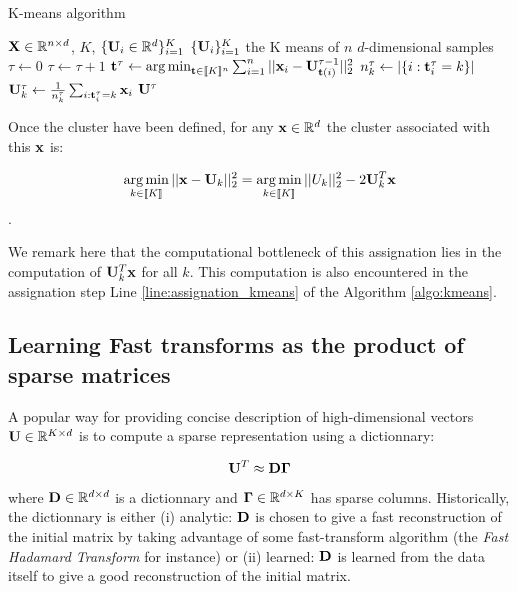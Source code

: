 \documentclass{article}
\def\rmGamma{{\mathbf{\Gamma}}}
\begin{document}
\begin{algorithm}
\caption{K-means algorithm}
\label{algo:kmeans}
\begin{algorithmic}[1]


\REQUIRE ${\mathbf{X}} \in \mathbb{R}^{n \times d}$, $K$, $\{{\mathbf{U}}_i \in \mathbb{R}^d\}_{i=1}^{K}$
\ENSURE $\{{\mathbf{U}}_i\}_{i=1}^{K}$ the K means of $n$ $d$-dimensional samples
\STATE $\tau \leftarrow 0$
\REPEAT
\STATE $\tau \leftarrow \tau + 1$
\STATE ${\mathbf{t}}^\tau \leftarrow \operatorname*{arg\,min}_{{\mathbf{t}} \in [\![K]\!]^n} \sum_{i=1}^{n} {||{\mathbf{x}}_i - {\mathbf{U}}^{\tau-1}_{{\mathbf{t}}(i)}||_2^2}$
\label{line:assignation_kmeans}
\STATE $n_k^\tau \leftarrow |\{i: {\mathbf{t}}^\tau_i=k\}|$
\STATE ${\mathbf{U}}^\tau_k \leftarrow \frac{1}{n_k^\tau} \sum_{i: {\mathbf{t}}^\tau_i = k} {{\mathbf{x}}_i}$
\label{line:compute_means}
\ENDFOR
{}
\RETURN ${\mathbf{U}}^\tau$
\end{algorithmic}
\end{algorithm}


Once the cluster have been defined, for any ${\mathbf{x}} \in \mathbb{R}^d$ the cluster associated with this ${\mathbf{x}}$ is:

\begin{equation}
\label{eq:assignation_problem_kmeans}
\operatorname*{arg\,min}_{k \in [\![K]\!]} ||{\mathbf{x}} - {\mathbf{U}}_{k}||_2^2 = \operatorname*{arg\,min}_{k \in [\![K]\!]} ||U_k||_2^2 - 2 {\mathbf{U}}_{k}^T{\mathbf{x}}
\end{equation}.


We remark here that the computational bottleneck of this assignation lies in the computation of ${\mathbf{U}}_k^T{\mathbf{x}}$ for all $k$. This computation is also encountered in the assignation step Line \ref{line:assignation_kmeans} of the Algorithm \ref{algo:kmeans}.


\subsection{Learning Fast transforms as the product of sparse matrices}

A popular way for providing concise description of high-dimensional vectors ${\mathbf{U}} \in \mathbb{R}^{K \times d}$ is to compute a sparse representation using a dictionnary:

\begin{equation}
\rmU^T \approx \rmD\rmGamma
\end{equation}

where ${\mathbf{D}} \in \mathbb{R}^{d \times d}$ is a dictionnary and $\rmGamma \in \R^{d \times K}$ has sparse columns. Historically, the dictionnary is either (i) analytic: ${\mathbf{D}}$ is chosen to give a fast reconstruction of the initial matrix by taking advantage of some fast-transform algorithm (the \textit{Fast Hadamard Transform} for instance) or (ii) learned: ${\mathbf{D}}$ is learned from the data itself to give a good reconstruction of the initial matrix.
\end{document}
